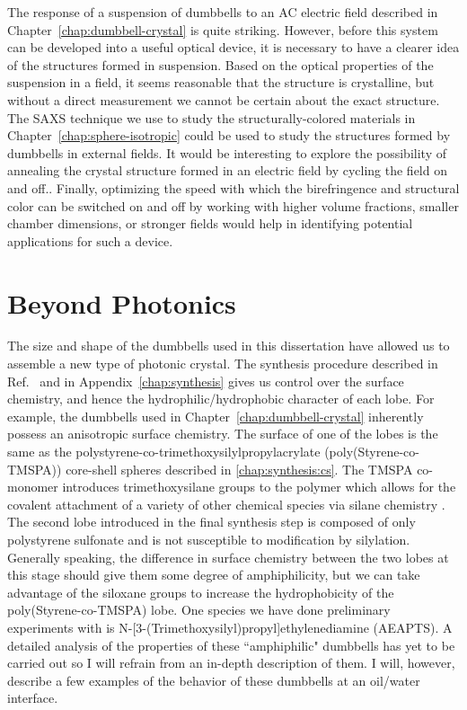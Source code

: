 The response of a suspension of dumbbells to an AC electric field described in Chapter~\ref{chap:dumbbell-crystal} is quite striking.
However, before this system can be developed into a useful optical device, it is necessary to have a clearer idea of the structures formed in suspension.
Based on the optical properties of the suspension in a field, it seems reasonable that the structure is crystalline, but without a direct measurement we cannot be certain about the exact structure.
The SAXS technique we use to study the structurally-colored materials in Chapter~\ref{chap:sphere-isotropic} could be used to study the structures formed by dumbbells in external fields.
It would be interesting to explore the possibility of annealing the crystal structure formed in an electric field by cycling the field on and off..
Finally, optimizing the speed with which the birefringence and structural color can be switched on and off by working with higher volume fractions, smaller chamber dimensions, or stronger fields would help in identifying potential applications for such a device.


\section{Beyond Photonics}

The size and shape of the dumbbells used in this dissertation have allowed us to assemble a new type of photonic crystal.
The synthesis procedure described in Ref.~\cite{Park2010} and in Appendix~\ref{chap:synthesis} gives us control over the surface chemistry, and hence the hydrophilic/hydrophobic character of each lobe.
For example, the dumbbells used in Chapter~\ref{chap:dumbbell-crystal} inherently possess an anisotropic surface chemistry.
The surface of one of the lobes is the same as the polystyrene-co-trimethoxysilylpropylacrylate (poly(Styrene-co-TMSPA)) core-shell spheres described in \ref{chap:synthesis:cs}.
The TMSPA co-monomer introduces trimethoxysilane groups to the polymer which allows for the covalent attachment of a variety of other chemical species via silane chemistry \cite{DerVoort:1996}.
The second lobe introduced in the final synthesis step is composed of only polystyrene sulfonate and is not susceptible to modification by silylation.
Generally speaking, the difference in surface chemistry between the two lobes at this stage should give them some degree of amphiphilicity, but we can take advantage of the siloxane groups to increase the hydrophobicity of the poly(Styrene-co-TMSPA) lobe.
One species we have done preliminary experiments with is N-[3-(Trimethoxysilyl)propyl]ethylenediamine (AEAPTS).
A detailed analysis of the properties of these ``amphiphilic" dumbbells has yet to be carried out so I will refrain from an in-depth description of them.
I will, however, describe a few examples of the behavior of these dumbbells at an oil/water interface.

